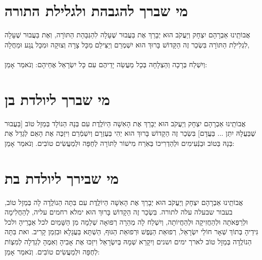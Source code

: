 \documentclass[a4paper, twoside, openany, parskip=half, 12pt]{article}
\begin{document}
\section*{מי שברך להגבהת ולגלילת התורה}
 אֲבוֹתֵֽינוּ אַבְרָהָם יִצְחָק וְיַעֲקֹב הוּא יְבָרֵךְ אֶת 
  בַּעֲבוּר שֶׁעָלָה לִהַגְּבָּהַת הַתּוׂרָה, וֽאֶת 
   בַּעֲבוּר שֶׁעָלָה לִגְלִילַת הַתּוׂרָה
 בִּשְׂכַר זֶה הַקָּדוֹשׁ בָּרוּךְ הוּא יִשְׁמְרֵם וְיַצִּילֵם מִכָּל צָרָה וְצוּקָה וּמִכָּל נֶֽגַע וּמַחֲלָה,\\
 \\
וְיִשְׁלַח בְּרָכָה וְהַצְלָחָה בְּכָל מַעֲשֵׂה יָדֵיהֶם
    עִם כָּל יִשְׂרָאֵל אֶחֵיהָם: וְנֹאמַר אָמֵן:
    
\clearpage

\section*{מי שברך ליולדת בן}
אֲבוֹתֵֽינוּ אַבְרָהָם יִצְחָק וְיַעֲקֹב הוּא יְבָרֵךְ אֶת הָאִשָׁה הַיוֹלֶֽדֶת 
 עִם בְּנָהּ הַנוֹלָד בְּמַזָל טוֹב [בַּעֲבוּר שֶׁבַּעֲלָהּ יִתֵּן ... בַּעֲדָם] בִּשְׂכַר זֶה הַקָדוֹשׁ בָּרוּךְ הוּא יְהִי בְּעֶזְרָם וְיִשְׁמְֿרֵם וִיזַכֶּה אֶת הָאֵם לְגַדֵל אֶת בְּנָהּ בַּטוֹב וּבַנְּֿעִימִים וּלְהַדְרִיכוֹ בְּאֹֽרַח מִישׁוֹר לַתּוֹרָה לְחֻפָּה וּלְמַעֲשִׂים טוֹבִים. וְנֹאמַר אָמֵן:\\

\section*{מי שבירך ליולדת בת}
 אֲבוֹתֵֽינוּ אַבְרָהָם יִצְחָק וְיַעֲקֹב הוּא יְבָרֵךְ אֶת הָאִשָׁה הַיוֹלֶֽדֶת 
 עִם בִּתָּה הַנוֹלֶֽדָה לָה בְּמַזָל טוֹב,
בעבור שבעלה עלה לתורה. בִּשְׂכַר זֶה הַקָדוֹשׁ בָּרוּךְ הוּא ימלא רחמים עליה, לְהַחֲלִימָה וּלְרַפְּאֹתָה וּלְהַחֲזִיקָה וּלְהַחֲיוֹתָה, וְיִשְׁלַח לָה מְהֵרָה רְפוּאָה שְׁלֵמָה מִן הַשָּׁמַיִם לכל אֵבָרֵיהָ ולכל גִּידֵיהָ בְּתוֹךְ שְׁאָר חוֹלֵי יִשְׂרָאֵל, רְפוּאַת הַנֶּפֶשׁ וּרְפוּאַת הַגּוּף,   הַשְׁתָּא בַּעֲגָלָא וּבִזְמַן קָרִיב. ואת בִּתָּה הַנוֹלֶֽדָה בְּמַזָל טוֹב לארך ימים ושנים
  וְיִקָרֵא שְׁמָהּ בְּיִשְׂרָאֵל 
   וִיזַכּוּ אֶת אָבִיהָ וְאִמֶהָ לְגַדְלָה לְמִצְוֹת לְחֻפָּה וּלְמַעֲשִׂים טוֹבִים. וְנֹאמַר אָמֵן:\\
\end{document}
